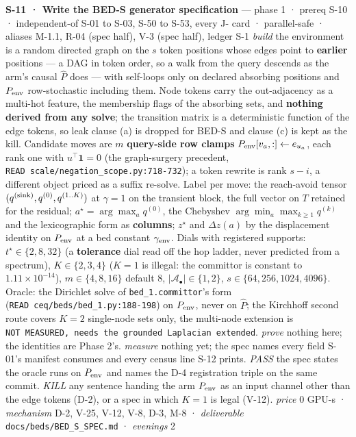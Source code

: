 \documentclass[11pt,a4paper]{article}
\theoremstyle{plain}
\theoremstyle{definition}
\theoremstyle{remark}
\begin{document}
\textbf{S-11 · Write the BED-S generator specification} --- phase 1 ·
prereq S-10 · independent-of S-01 to S-03, S-50 to S-53, every J- card ·
parallel-safe · aliases M-1.1, R-04 (spec half), V-3 (spec half), ledger
S-1 \emph{build} the environment is a random directed graph on the \(s\)
token positions whose edges point to \textbf{earlier} positions --- a
DAG in token order, so a walk from the query descends as the arm's
causal \(\hat P\) does --- with self-loops only on declared absorbing
positions and \(P_{\rm env}\) row-stochastic including them. Node tokens
carry the out-adjacency as a multi-hot feature, the membership flags of
the absorbing sets, and \textbf{nothing derived from any solve}; the
transition matrix is a deterministic function of the edge tokens, so
leak clause (a) is dropped for BED-S and clause (c) is kept as the kill.
Candidate moves are \(m\) \textbf{query-side row clamps}
\(P_{\rm env}[v_a,:]\leftarrow e_{u_a}\), each rank one with
\(u^\top\mathbf 1=0\) (the graph-surgery precedent,
\texttt{READ\ scale/negation\_scope.py:718-732}); a token rewrite is
rank \(s-i\), a different object priced as a suffix re-solve. Label per
move: the reach-avoid tensor \((q^{({\rm sink})},q^{(0)},q^{(1..K)})\)
at \(\gamma=1\) on the transient block, the full vector on \(T\)
retained for the residual; \(a^\star=\arg\max_a q^{(0)}\), the Chebyshev
\(\arg\min_a\max_{k\ge1}q^{(k)}\) and the lexicographic form as
\textbf{columns}; \(z^\star\) and \(\Delta z(a)\) by the displacement
identity on \(P_{\rm env}\) at a bed constant \(\gamma_{\rm env}\).
Dials with registered supports: \(t^\star\in\{2,8,32\}\) (a
\textbf{tolerance} dial read off the hop ladder, never predicted from a
spectrum), \(K\in\{2,3,4\}\) (\(K=1\) is illegal: the committor is
constant to \(1.11\times10^{-14}\)), \(m\in\{4,8,16\}\) default \(8\),
\(|\mathcal{A}_\bullet|\in\{1,2\}\), \(s\in\{64,256,1024,4096\}\).
Oracle: the Dirichlet solve of \texttt{bed\_1.committor}'s form
(\texttt{READ\ ceq/beds/bed\_1.py:188-198}) on \(P_{\rm env}\), never on
\(\hat P\); the Kirchhoff second route covers \(K=2\) single-node sets
only, the multi-node extension is
\texttt{NOT\ MEASURED,\ needs\ the\ grounded\ Laplacian\ extended}.
\emph{prove} nothing here; the identities are Phase 2's. \emph{measure}
nothing yet; the spec names every field S-01's manifest consumes and
every census line S-12 prints. \emph{PASS} the spec states the oracle
runs on \(P_{\rm env}\) and names the D-4 registration triple on the
same commit. \emph{KILL} any sentence handing the arm \(P_{\rm env}\) as
an input channel other than the edge tokens (D-2), or a spec in which
\(K=1\) is legal (V-12). \emph{price} \(0\) GPU-s · \emph{mechanism}
D-2, V-25, V-12, V-8, D-3, M-8 · \emph{deliverable}
\texttt{docs/beds/BED\_S\_SPEC.md} · \emph{evenings} 2
\end{document}
